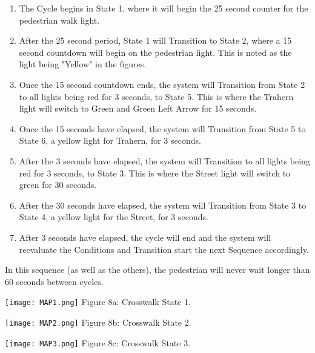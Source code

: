\documentclass{article}
\begin{document}
\begin{enumerate}
\item The Cycle begins in State 1, where it will begin the 25 second counter for the pedestrian walk light. 

\item After the 25 second period, State 1 will Transition to State 2, where a 15 second countdown will begin on the pedestrian light. This is noted as the light being "Yellow" in the figures.

\item Once the 15 second countdown ends, the system will Transition from State 2 to all lights being red for 3 seconds, to State 5. This is where the Trahern light will switch to Green and Green Left Arrow for 15 seconds.

\item Once the 15 seconds have elapsed, the system will Transition from State 5 to State 6, a yellow light for Trahern, for 3 seconds.

\item After the 3 seconds have elapsed, the system will Transition to all lights being red for 3 seconds, to State 3. This is where the Street light will switch to green for 30 seconds.

\item After the 30 seconds have elapsed, the system will Transition from State 3 to State 4, a yellow light for the Street, for 3 seconds.

\item After 3 seconds have elapsed, the cycle will end and the system will reevaluate the Conditions and Transition start the next Sequence accordingly.

\end{enumerate}

In this sequence (as well as the others), the pedestrian will never wait longer than 60 seconds between cycles.



\begin{multicols}{3}

\begin{center}
\texttt{[image: MAP1.png]}
\scriptsize{
Figure 8a: Crosswalk State 1.
}
\end{center}

\begin{center}
\texttt{[image: MAP2.png]}
\scriptsize{
Figure 8b: Crosswalk State 2.
}
\end{center}

\begin{center}
\texttt{[image: MAP3.png]}
\scriptsize{
Figure 8c: Crosswalk State 3.
}
\end{center}

\end{multicols}
\end{document}
